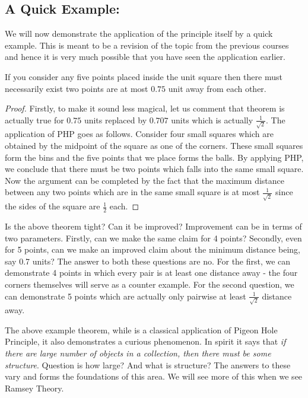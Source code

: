 \subsection{A Quick Example: }

We will now demonstrate the application of the principle itself by a quick example. This is meant to be a revision of the topic from the previous courses and hence it is very much possible that you have seen the application earlier.

\begin{theorem}
If you consider any five points placed inside the unit square then there must necessarily exist two points are at most $0.75$ unit away from each other.
\end{theorem}
\begin{proof}
Firstly, to make it sound less magical, let us comment that  theorem is actually true for $0.75$ units replaced by $0.707$ units which is actually $\frac{1}{\sqrt{2}}$. The application of PHP goes as follows. Consider four small squares which are obtained by the midpoint of the square as one of the corners. These small squares form the bins and the five points that we place forms the balls. By applying PHP, we conclude that there must be two points which falls into the same small square. Now the argument can be completed by the fact that the maximum distance between any two points which are in the same small square is at most $\frac{1}{\sqrt{2}}$ since the sides of the square are $\frac{1}{2}$ each.
\end{proof}
\begin{remark}[{\bf Tightness}]
Is the above theorem tight? Can it be improved? Improvement can be in terms of two parameters. Firstly, can we make the same claim for 4 points? Secondly, even for 5 points, can we make an improved claim about the minimum distance being, say 0.7 units? The answer to both these questions are no. For the first, we can demonstrate  4 points in which every pair is at least one distance away - the four corners themselves will serve as a counter example. For the second question, we can demonstrate 5 points which are actually only pairwise at least $\frac{1}{\sqrt{2}}$ distance away. 
\end{remark}

\begin{remark}
The above example theorem, while is a classical application of Pigeon Hole Principle, it also demonstrates a curious phenomenon. In spirit it says that \textit{if there are large number of objects in a collection, then there must be some structure}. Question is how large? And what is structure? The answers to these vary and forms the foundations of this area. We will see more of this when we see Ramsey Theory.
\end{remark}


